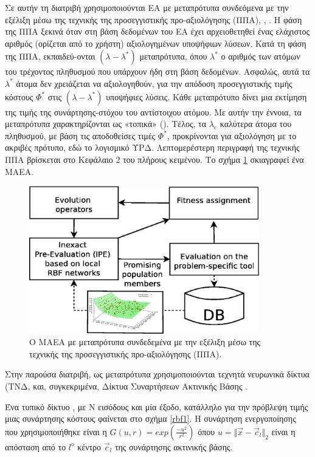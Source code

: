 Σε αυτήν τη διατριβή χρησιμοποιούνται ΕΑ με μεταπρότυπα συνδεόμενα με την εξέλιξη μέσω της τεχνικής της προσεγγιστικής προ-αξιολόγησης (ΠΠΑ), , \cite{phd_Giotis,phd_Karakasis,phd_Kampolis,phd_Vera,LTT_2_018,LTT_2_044}. Η φάση της ΠΠΑ ξεκινά όταν στη βάση δεδομένων του ΕΑ έχει αρχειοθετηθεί ένας ελάχιστος αριθμός (ορίζεται από το χρήστη) αξιολογημένων υποψήφιων λύσεων.  Κατά τη φάση της ΠΠΑ, εκπαιδεύ-ονται $(\lambda\!-\!\lambda^*)$ μεταπρότυπα, όπου $\lambda^*$ ο αριθμός των ατόμων του τρέχοντος πληθυσμού που υπάρχουν ήδη στη βάση δεδομένων. Ασφαλώς,  αυτά τα $\lambda^*$ άτομα δεν χρειάζεται να αξιολογηθούν, για την απόδοση προσεγγιστικής τιμής κόστους $\Phi^*$ στις $(\lambda\!-\!\lambda^*)$ υποψήφιες λύσεις. Κάθε μεταπρότυπο δίνει μια εκτίμηση της τιμής της συνάρτησης-στόχου του αντίστοιχου ατόμου. Με αυτήν την έννοια, τα μεταπρότυπα χαρακτηρίζονται ως «τοπικά» (). Τέλος, τα $\lambda_e$ καλύτερα άτομα του πληθυσμού, με βάση τις αποδοθείσες τιμές  $\Phi^*$, προκρίνονται για αξιολόγηση με το ακριβές πρότυπο, εδώ το λογισμικό ΥΡΔ. Λεπτομερέστερη περιγραφή της τεχνικής ΠΠΑ βρίσκεται στο Κεφάλαιο $2$ του πλήρους κειμένου. Το σχήμα \ref{MAEA} σκιαγραφεί ένα ΜΑΕΑ. 

\begin{figure}[h!]
\centering
\includegraphics[width=100mm]{MAEA.eps} 
\caption{Ο ΜΑΕΑ με μεταπρότυπα συνδεδεμένα με την εξέλιξη μέσω της τεχνικής της προσεγγιστικής προ-αξιολόγησης (ΠΠΑ).}
\label{MAEA}
\end{figure}

Στην παρούσα διατριβή, ως μεταπρότυπα χρησιμοποιούνται τεχνητά νευρωνικά δίκτυα (ΤΝΔ,  και, συγκεκριμένα, Δίκτυα Συναρτήσεων Ακτινικής Βάσης  \cite{Haykin}.

Ένα τυπικό δίκτυο , με Ν εισόδους και μία έξοδο, κατάλληλο για την πρόβλεψη τιμής μιας συνάρτησης κόστους φαίνεται στο σχήμα \ref{rbf1}. Η συνάρτηση ενεργοποίησης που χρησιμοποιήθηκε είναι η $
	G(u,r)=exp(\frac{-u^2}{r^2})$  
όπου  $u=\Vert \vec{x}-\vec{c}_l \Vert_2$ είναι η απόσταση από το $l^{o}$ κέντρο $\vec{c}_l$ της συνάρτησης ακτινικής βάσης.

